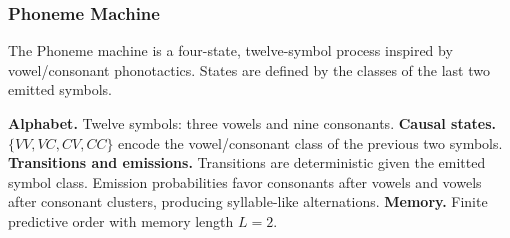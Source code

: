 \subsubsection{Phoneme Machine}
The Phoneme machine is a four-state, twelve-symbol process inspired by vowel/consonant phonotactics. States are defined by the classes of the last two emitted symbols.

\textbf{Alphabet.} Twelve symbols: three vowels and nine consonants.  
\textbf{Causal states.} $\{VV, VC, CV, CC\}$ encode the vowel/consonant class of the previous two symbols.  
\textbf{Transitions and emissions.} Transitions are deterministic given the emitted symbol class. Emission probabilities favor consonants after vowels and vowels after consonant clusters, producing syllable-like alternations.  
\textbf{Memory.} Finite predictive order with memory length $L=2$.
